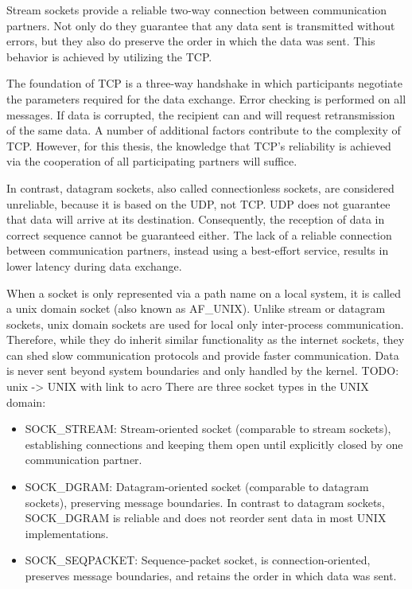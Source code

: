 Stream sockets provide a reliable two-way connection between communication partners.
Not only do they guarantee that any data sent is transmitted without errors, but they also do preserve the order in which the data was sent.
This behavior is achieved by utilizing the \ac{TCP}.\cite{beej:sockets}

The foundation of \ac{TCP} is a three-way handshake in which participants negotiate the parameters required for the data exchange.
Error checking is performed on all messages.
If data is corrupted, the recipient can and will request retransmission of the same data.
A number of additional factors contribute to the complexity of \ac{TCP}.
However, for this thesis, the knowledge that \ac{TCP}'s reliability is achieved via the cooperation of all participating partners will suffice.

In contrast, datagram sockets, also called connectionless sockets, are considered unreliable, because it is based on the \ac{UDP}, not \ac{TCP}.
\ac{UDP} does not guarantee that data will arrive at its destination.
Consequently, the reception of data in correct sequence cannot be guaranteed either.
The lack of a reliable connection between communication partners, instead using a best-effort service, results in lower latency during data exchange.\cite{beej:sockets}

When a socket is only represented via a path name on a local system, it is called a unix domain socket (also known as AF\_UNIX).
Unlike stream or datagram sockets, unix domain sockets are used for local only inter-process communication.
Therefore, while they do inherit similar functionality as the internet sockets, they can shed slow communication protocols and provide faster communication.
Data is never sent beyond system boundaries and only handled by the kernel.
TODO: unix -> UNIX with link to acro
There are three socket types in the UNIX domain\cite{man:unixsockets}:
\begin{itemize}
    \itemsep0em
    \item SOCK\_STREAM\@: Stream-oriented socket (comparable to stream sockets), establishing connections and keeping them open until explicitly closed by one communication partner.
    \item SOCK\_DGRAM\@: Datagram-oriented socket (comparable to datagram sockets), preserving message boundaries. In contrast to datagram sockets, SOCK\_DGRAM is reliable and does not reorder sent data in most UNIX implementations.
    \item SOCK\_SEQPACKET\@: Sequence-packet socket, is connection-oriented, preserves message boundaries, and retains the order in which data was sent.
\end{itemize}


